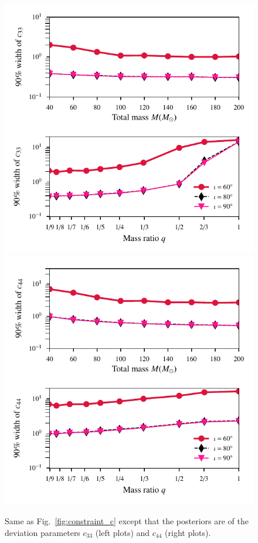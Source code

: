 \documentclass[prd,preprintnumbers,twocolumn,eqsecnum,floatfix,a4paper,nofootinbib,superscriptaddress]{revtex4}
\begin{document}
\begin{figure}[tbh]
	\centering
	\includegraphics[scale=0.75]{figs/90_percent_bounds_c3.pdf}
	\includegraphics[scale=0.75]{figs/90_percent_bounds_c4.pdf}
	\caption{Same as Fig.~\ref{fig:constraint_c} except that the posteriors are of the deviation parameters $c_{33}$ (left plots) and  $c_{44}$ (right plots).}  
	\label{fig:constraint_c33_c44}
\end{figure}
\end{document}
